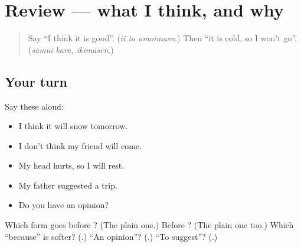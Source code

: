 \section[(review)]{Review — what I think, and why}

\label{lesson:JA-R254-what-i-think-and-why}



\begin{quote}
Say \textquotedblleft{}I think it is good\textquotedblright{}. (\emph{ii to omoimasu}.) Then \textquotedblleft{}it is cold, so I won't go\textquotedblright{}. (\emph{samui kara, ikimasen}.)
\end{quote}

\subsection*{Your turn}
Say these aloud:

\begin{itemize}
\raggedright
  \item I think it will snow tomorrow.
  \item I don't think my friend will come.
  \item My head hurts, so I will rest.
  \item My father suggested a trip.
  \item Do you have an opinion?
\end{itemize}

\begin{tcolorbox}[breakable,colback=teal!4,colframe=teal!35!black,title={Before you move on}]
Which form goes before \textbf{ }? (The plain one.) Before \textbf{}? (The plain one too.) Which \textquotedblleft{}because\textquotedblright{} is softer? (\textbf{}.) \textquotedblleft{}An opinion\textquotedblright{}? (\textbf{}.) \textquotedblleft{}To suggest\textquotedblright{}? (\textbf{}.)
\end{tcolorbox}

